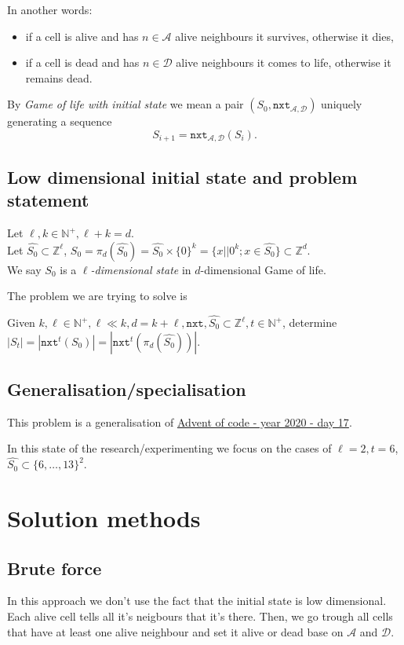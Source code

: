 \documentclass[]{article}
\newcommand{\NN}{\mathbb N}
\newcommand{\ZZ}{\mathbb Z}
\newcommand{\calA}{\mathcal A}
\newcommand{\calD}{\mathcal D}
\newcommand{\nxt}{\texttt{nxt}}
\begin{document}
	In another words:
	\begin{itemize}
		\item
		if a cell is alive and has $n \in \calA$ alive neighbours it survives, otherwise it dies,
		\item
		if a cell is dead and has $n \in \calD$ alive neighbours it comes to life, otherwise it remains dead.
	\end{itemize}
	
	By \emph{Game of life with initial state} we mean a pair $(S_0, \nxt_{\calA, \calD})$ uniquely generating a sequence
	$$S_{i+1} = \nxt_{\calA, \calD}(S_i).$$
	
	\subsection{Low dimensional initial state and problem statement}
	
	Let $\ell,k \in \NN^+, \ell+k = d$.\\
	Let $\widehat{S_0} \subset \ZZ^\ell$, $S_0 = \pi_d(\widehat{S_0}) = \widehat{S_0} \times\{0\}^k = \{x||0^k; x \in \widehat{S_0}\} \subset \ZZ^d$.\\
	
	We say $S_0$ is a \emph{$\ell$-dimensional state} in $d$-dimensional Game of life.
	
	The problem we are trying to solve is
	
	\begin{center}
		Given $k, \ell \in \NN^+, \ell \ll k, d = k+\ell, \nxt, \widehat{S_0} \subset \ZZ^\ell, t \in \NN^+$, determine\\
		$|S_t| = |\nxt^t(S_0)| = |\nxt^t(\pi_d(\widehat{S_0}))|.$
	\end{center}
	
	\subsection{Generalisation/specialisation}
	This problem is a generalisation of \href{https://adventofcode.com/2020/day/17}{Advent of code - year 2020 - day 17}.
	
	In this state of the research/experimenting we focus on the cases of $\ell = 2, t=6$, $\widehat{S_0} \subset \{6,\dots,13\}^2$.
	
	\newpage
	\section{Solution methods}
	\subsection{Brute force}
	In this approach we don't use the fact that the initial state is low dimensional. Each alive cell tells all it's neigbours that it's there. Then, we go trough all cells that have at least one alive neighbour and set it alive or dead base on $\calA$ and $\calD$.
	
\end{document}
